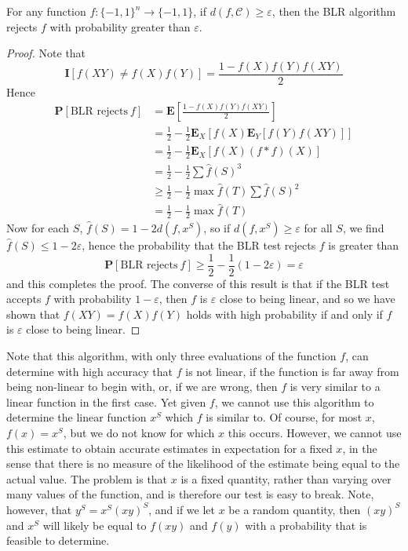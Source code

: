 \begin{theorem}
    For any function $f: \{ -1, 1 \}^n \to \{ -1, 1 \}$, if $d(f,\mathcal{C}) \geq \varepsilon$, then the BLR algorithm rejects $f$ with probability greater than $\varepsilon$.
\end{theorem}
\begin{proof}
    Note that
    \[ \mathbf{I}[f(XY) \neq f(X)f(Y)] = \frac{1 - f(X)f(Y)f(XY)}{2} \]
    Hence
    \begin{align*}
        \mathbf{P}[\text{BLR rejects}\ f] &= \mathbf{E} \left[ \frac{1 - f(X)f(Y)f(XY)}{2} \right]\\
        &= \frac{1}{2} - \frac{1}{2} \mathbf{E}_X[f(X) \mathbf{E}_Y[f(Y) f(XY)]]\\
        &= \frac{1}{2} - \frac{1}{2} \mathbf{E}_X[f(X) (f * f)(X)]\\
        &= \frac{1}{2} - \frac{1}{2} \sum \widehat{f}(S)^3\\
        &\geq \frac{1}{2} - \frac{1}{2} \max \widehat{f}(T) \sum \widehat{f}(S)^2\\
        &= \frac{1}{2} - \frac{1}{2} \max \widehat{f}(T)
    \end{align*}
    Now for each $S$, $\widehat{f}(S) = 1 - 2 d(f, x^S)$, so if $d(f,x^S) \geq \varepsilon$ for all $S$, we find $\widehat{f}(S) \leq 1 - 2 \varepsilon$, hence the probability that the BLR test rejects $f$ is greater than
    \[ \mathbf{P}[\text{BLR rejects}\ f] \geq \frac{1}{2} - \frac{1}{2} (1 - 2 \varepsilon) = \varepsilon \]
    and this completes the proof. The converse of this result is that if the BLR test accepts $f$ with probability $1 - \varepsilon$, then $f$ is $\varepsilon$ close to being linear, and so we have shown that $f(XY) = f(X)f(Y)$ holds with high probability if and only if $f$ is $\varepsilon$ close to being linear.
\end{proof}

Note that this algorithm, with only three evaluations of the function $f$, can determine with high accuracy that $f$ is not linear, if the function is far away from being non-linear to begin with, or, if we are wrong, then $f$ is very similar to a linear function in the first case. Yet given $f$, we cannot use this algorithm to determine the linear function $x^S$ which $f$ is similar to. Of course, for most $x$, $f(x) = x^S$, but we do not know for which $x$ this occurs. However, we cannot use this estimate to obtain accurate estimates in expectation for a fixed $x$, in the sense that there is no measure of the likelihood of the estimate being equal to the actual value. The problem is that $x$ is a fixed quantity, rather than varying over many values of the function, and is therefore our test is easy to break. Note, however, that $y^S = x^S (xy)^S$, and if we let $x$ be a random quantity, then $(xy)^S$ and $x^S$ will likely be equal to $f(xy)$ and $f(y)$ with a probability that is feasible to determine.

